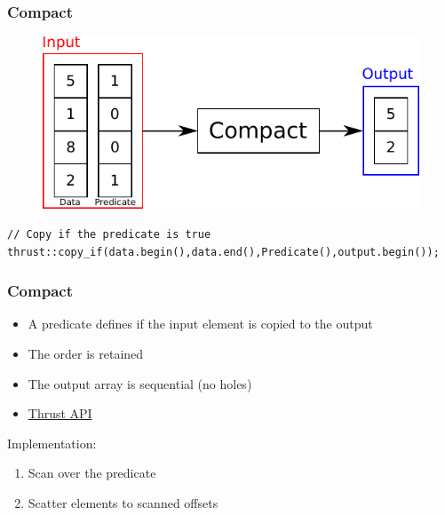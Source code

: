 \documentclass[aspectratio=169,handout]{beamer}
\begin{document}
\begin{frame}[fragile]
\frametitle{Compact}
\begin{figure}
	\centering
	\includegraphics[height=0.6\textheight]{o_compact}
\end{figure}

\begin{lstlisting}
// Copy if the predicate is true
thrust::copy_if(data.begin(),data.end(),Predicate(),output.begin());
\end{lstlisting}
\end{frame}

\begin{frame}[fragile]
\frametitle{Compact}
\begin{itemize}
	\item A predicate defines if the input element is copied to the output
	\item<2-> The order is retained
	\item<2-> The output array is sequential (no holes)
	\item<2-> \href{https://thrust.github.io/doc/group__stream__compaction.html}{Thrust API}
\end{itemize}
Implementation:
\begin{enumerate}
	\item Scan over the predicate
	\item Scatter elements to scanned offsets
\end{enumerate}
\end{frame}
\end{document}
